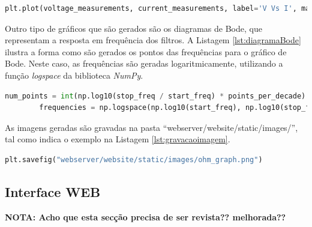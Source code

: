 \begin{minipage}{0.9\linewidth}
	\begin{lstlisting}[language=Python,escapechar=|, caption=Gráfico Corrente \textit{vs} Tensão, label=lst:graficoUvsI]
		plt.plot(voltage_measurements, current_measurements, label='V Vs I', marker = 'o')
	\end{lstlisting}
\end{minipage}

Outro tipo de gráficos que são gerados são os diagramas de Bode, que representam a resposta em frequência dos filtros. A Listagem \ref{lst:diagramaBode} ilustra a forma como são gerados os pontos das frequências para o gráfico de Bode. Neste caso, as frequências são geradas logaritmicamente, utilizando a função \textit{logspace} da biblioteca \textit{NumPy}.

\begin{minipage}{0.9\linewidth}
	\begin{lstlisting}[language=Python,escapechar=|, caption=Filtros - Diagrama de \textit{Bode}, label=lst:diagramaBode]
		num_points = int(np.log10(stop_freq / start_freq) * points_per_decade)
		frequencies = np.logspace(np.log10(start_freq), np.log10(stop_freq), num=num_points)	
	\end{lstlisting}
\end{minipage}

As imagens geradas são gravadas na pasta ``webserver/website/static/images/'', tal como indica o exemplo na Listagem \ref{lst:gravacaoimagem}. 

\begin{minipage}{0.9\linewidth}
	\begin{lstlisting}[language=Python,escapechar=|, caption=Gravação do gráfico, label=lst:gravacaoimagem]
	    plt.savefig("webserver/website/static/images/ohm_graph.png")	
	\end{lstlisting}
\end{minipage}

\subsection{Interface WEB}
\label{sec:interfaceweb}
\textbf{NOTA: Acho que esta secção precisa de ser revista?? melhorada??}


